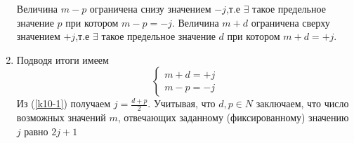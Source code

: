 \documentclass[__main__.tex]{subfiles}
\begin{document}
\begin{enumerate}
			Величина $m-p$ ограничена снизу значением $-j$,т.е $\exists$ такое предельное значение $p$ при котором $m-p = -j$. Величина $m+d$ ограничена сверху значением $+j$,т.е $\exists$ такое предельное значение $d$ при котором $m+d = +j$.
		\item Подводя итоги имеем
			\begin{equation}
				\label{k10-1}
				\begin{cases}
					m+d = +j\\
					m-p = -j
				\end{cases}
			\end{equation}	
			Из (\ref{k10-1}) получаем $j = \frac{d+p}{2}$. Учитывая, что $d,p \in N$ заключаем, что число возможных значений $m$, отвечающих заданному (фиксированному) значению $j$ равно $2j+1$
	\end{enumerate}
\end{document}
